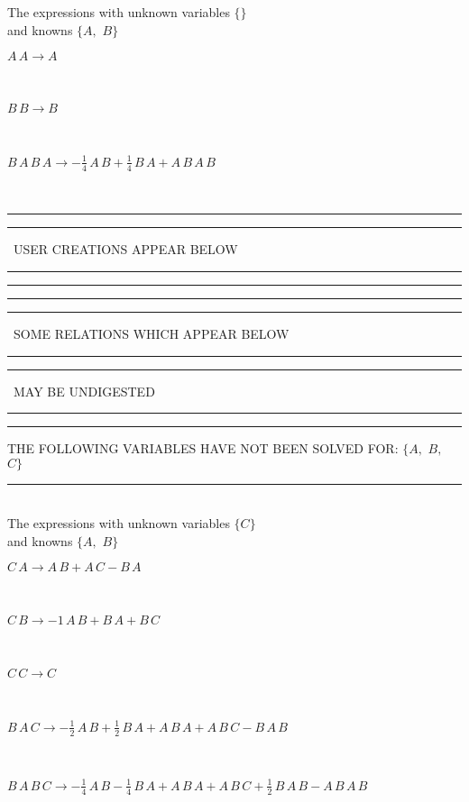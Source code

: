 The expressions with unknown variables $\{\}$\\
and knowns $\{A,
$ $
B\}$\smallskip\\
\begin{minipage}{6in}
$
A\,
 A\rightarrow A
$
\end{minipage}\medskip \\
\begin{minipage}{6in}
$
B\,
 B\rightarrow B
$
\end{minipage}\medskip \\
\begin{minipage}{6in}
$
B\,
 A\,
 B\,
 A\rightarrow -\frac{1}{4}\,
 A\,
 B + \frac{1}{4}\,
 B\,
 A + A\,
 B\,
 A\,
 B
$
\end{minipage}\\
\rule[2pt]{6in}{1pt}\hfil\break
\rule[2.5pt]{1.701in}{1pt}
\ USER CREATIONS APPEAR BELOW\ 
\rule[2.5pt]{1.701in}{1pt}\hfil\break
\rule[2pt]{6in}{1pt}\hfil\break
\rule[2pt]{6in}{4pt}\hfil\break
\rule[2pt]{1.45in}{4pt}
\ SOME RELATIONS WHICH APPEAR BELOW\ 
\rule[2pt]{1.45in}{4pt}\hfil\break
\rule[2pt]{2.18in}{4pt}
\ MAY BE UNDIGESTED\ 
\rule[2pt]{2.18in}{4pt}\hfil\break
\rule[2pt]{6in}{4pt}\hfil\break
THE FOLLOWING VARIABLES HAVE NOT BEEN SOLVED FOR:\hfil\break
$\{A,
$ $
B,
$ $
C\}$
\smallskip\\
\rule[3pt]{6in}{.7pt}\\
The expressions with unknown variables $\{C\}$\\
and knowns $\{A,
$ $
B\}$\smallskip\\
\begin{minipage}{6in}
$
C\,
 A\rightarrow A\,
 B + A\,
 C - B\,
 A
$
\end{minipage}\medskip \\
\begin{minipage}{6in}
$
C\,
 B\rightarrow -1\,
 A\,
 B + B\,
 A + B\,
 C
$
\end{minipage}\medskip \\
\begin{minipage}{6in}
$
C\,
 C\rightarrow C
$
\end{minipage}\medskip \\
\begin{minipage}{6in}
$
B\,
 A\,
 C\rightarrow -\frac{1}{2}\,
 A\,
 B + \frac{1}{2}\,
 B\,
 A + A\,
 B\,
 A + A\,
 B\,
 C - B\,
 A\,
 B
$
\end{minipage}\medskip \\
\begin{minipage}{6in}
$
B\,
 A\,
 B\,
 C\rightarrow -\frac{1}{4}\,
 A\,
 B - \frac{1}{4}\,
 B\,
 A + A\,
 B\,
 A + A\,
 B\,
 C + \frac{1}{2}\,
 B\,
 A\,
 B - A\,
 B\,
 A\,
 B
$
\end{minipage}\\
\vspace{10pt}


